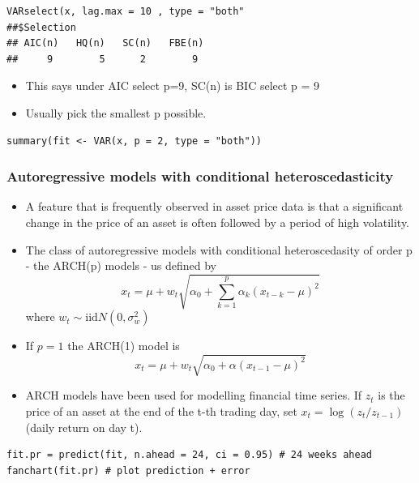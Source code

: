 \documentclass{article}
\begin{document}
\begin{lstlisting}
VARselect(x, lag.max = 10 , type = "both" 
##$Selection
## AIC(n)   HQ(n)   SC(n)   FBE(n)
##     9        5      2        9
\end{lstlisting}

\begin{itemize}
    \item This says under AIC select p=9, SC(n) is BIC select p = 9
    \item Usually pick the smallest p possible.
\end{itemize}

\begin{lstlisting}
summary(fit <- VAR(x, p = 2, type = "both"))
\end{lstlisting}

\subsubsection{Autoregressive models with conditional heteroscedasticity}
\begin{itemize}
    \item A feature that is frequently observed in asset price data is that a significant change in the price of an asset is often followed by a period of high volatility.
    \item The class of autoregressive models with conditional heteroscedasity of order p - the ARCH(p) models - us defined by
    \begin{equation*}
        x_t = \mu + w_t \sqrt{\alpha_0 + \sum_{k=1}^p \alpha_k (x_{t-k} - \mu)^2}
    \end{equation*}
    where $w_t \sim \mathrm{iid} N(0,\sigma^2_w)$
    \item If $p = 1$ the ARCH(1) model is
    \begin{equation*}
        x_t = \mu + w_t\sqrt{\alpha_0 + \alpha(x_{t-1}-\mu)^2}
    \end{equation*}
    \item ARCH models have been used for modelling financial time series. If $z_t$ is the price of an asset at the end of the t-th trading day, set $x_t = \log(z_t/z_{t-1})$ (daily return on day t).
\end{itemize}

\begin{lstlisting}
fit.pr = predict(fit, n.ahead = 24, ci = 0.95) # 24 weeks ahead
fanchart(fit.pr) # plot prediction + error
\end{lstlisting}
\end{document}
